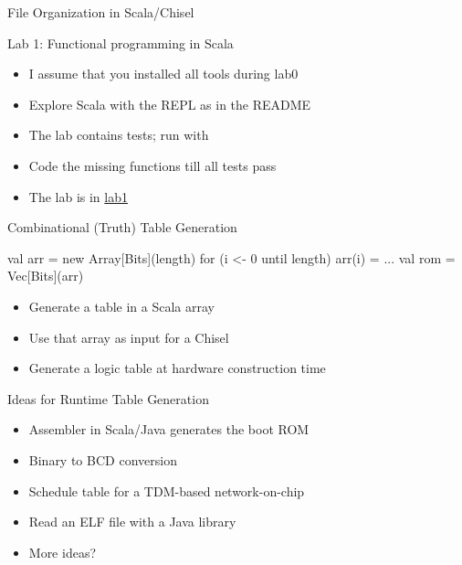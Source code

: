 \begin{frame}[fragile]{File Organization in Scala/Chisel}
\end{frame}


\begin{frame}[fragile]{Lab 1: Functional programming in Scala}
\begin{itemize}
\item I assume that you installed all tools during lab0
\item Explore Scala with the REPL as in the README
\item The lab contains tests; run with 
\item Code the missing functions till all tests pass
\item The lab is in \href{https://github.com/schoeberl/agile-hw/tree/main/lab1}{lab1}
\end{itemize}
\end{frame}




\begin{frame}[fragile]{Combinational (Truth) Table Generation}
\begin{chisel}
val arr = new Array[Bits](length)
for (i <- 0 until length) {
  arr(i) = ...
}
val rom = Vec[Bits](arr)
\end{chisel}
\begin{itemize}
\item Generate a table in a Scala array
\item Use that array as input for a Chisel 
\item Generate a logic table at hardware construction time
\end{itemize}
\end{frame}

\begin{frame}[fragile]{Ideas for Runtime Table Generation}
\begin{itemize}
\item Assembler in Scala/Java generates the boot ROM
\item Binary to BCD conversion
\item Schedule table for a TDM-based network-on-chip
\item Read an ELF file with a Java library
\item More ideas?
\end{itemize}
\end{frame}



